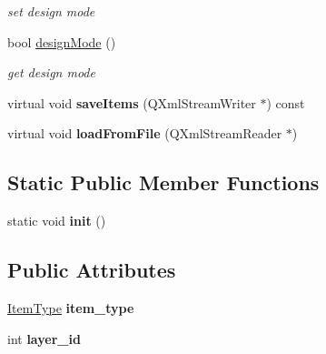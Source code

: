 \begin{DoxyCompactItemize}
\begin{DoxyCompactList}\small\item\em set design mode \end{DoxyCompactList}\item 
bool \hyperlink{classprim_1_1Item_abbd09ee53e8c057184f2c2e702496059}{design\+Mode} ()\hypertarget{classprim_1_1Item_abbd09ee53e8c057184f2c2e702496059}{}\label{classprim_1_1Item_abbd09ee53e8c057184f2c2e702496059}

\begin{DoxyCompactList}\small\item\em get design mode \end{DoxyCompactList}\item 
virtual void {\bfseries save\+Items} (Q\+Xml\+Stream\+Writer $\ast$) const \hypertarget{classprim_1_1Item_ae336707c628f8f5079a5bc60a599e513}{}\label{classprim_1_1Item_ae336707c628f8f5079a5bc60a599e513}

\item 
virtual void {\bfseries load\+From\+File} (Q\+Xml\+Stream\+Reader $\ast$)\hypertarget{classprim_1_1Item_a35f7e8f106e8263f059700a8f63c7728}{}\label{classprim_1_1Item_a35f7e8f106e8263f059700a8f63c7728}

\end{DoxyCompactItemize}
\subsection*{Static Public Member Functions}
\begin{DoxyCompactItemize}
\item 
static void {\bfseries init} ()\hypertarget{classprim_1_1Item_a1714fdab34f3fd64f897e73deabb7c01}{}\label{classprim_1_1Item_a1714fdab34f3fd64f897e73deabb7c01}

\end{DoxyCompactItemize}
\subsection*{Public Attributes}
\begin{DoxyCompactItemize}
\item 
\hyperlink{classprim_1_1Item_a5c096201e92c0b15a62c7af1cff1d79c}{Item\+Type} {\bfseries item\+\_\+type}\hypertarget{classprim_1_1Item_ad8df001372c1ee5bba97beab8dd27058}{}\label{classprim_1_1Item_ad8df001372c1ee5bba97beab8dd27058}

\item 
int {\bfseries layer\+\_\+id}\hypertarget{classprim_1_1Item_af3678c770be3b1670cf0a90f04bb11f4}{}\label{classprim_1_1Item_af3678c770be3b1670cf0a90f04bb11f4}

\end{DoxyCompactItemize}

